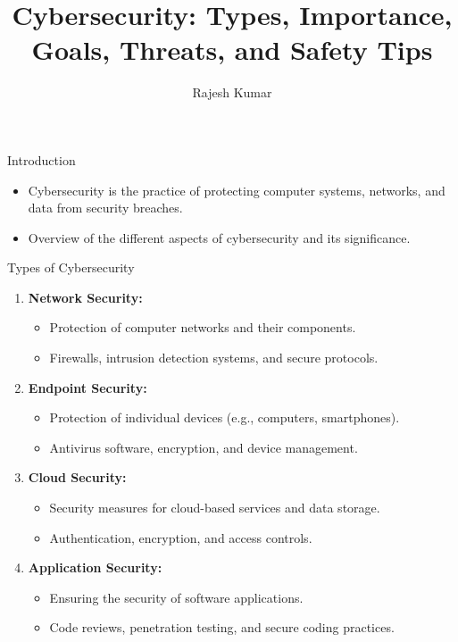 
\title{Cybersecurity: Types, Importance, Goals, Threats, and Safety Tips}
\author{Rajesh Kumar}
\date{}


\begin{frame}
  \titlepage
\end{frame}

\begin{frame}{Introduction}
  \begin{itemize}
    \item Cybersecurity is the practice of protecting computer systems, networks, and data from security breaches.
    \item Overview of the different aspects of cybersecurity and its significance.
  \end{itemize}
\end{frame}

\begin{frame}{Types of Cybersecurity}
  \begin{enumerate}
    \item \textbf{Network Security:}
      \begin{itemize}
        \item Protection of computer networks and their components.
        \item Firewalls, intrusion detection systems, and secure protocols.
      \end{itemize}
    \item \textbf{Endpoint Security:}
      \begin{itemize}
        \item Protection of individual devices (e.g., computers, smartphones).
        \item Antivirus software, encryption, and device management.
      \end{itemize}
    \item \textbf{Cloud Security:}
      \begin{itemize}
        \item Security measures for cloud-based services and data storage.
        \item Authentication, encryption, and access controls.
      \end{itemize}
    \item \textbf{Application Security:}
      \begin{itemize}
        \item Ensuring the security of software applications.
        \item Code reviews, penetration testing, and secure coding practices.
      \end{itemize}
  \end{enumerate}
\end{frame}

